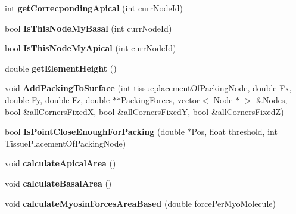 \begin{DoxyCompactItemize}
\item 
\hypertarget{classPrism_a10377e0ad0ae454a3cd25b82709119ac}{}int {\bfseries get\+Correcponding\+Apical} (int curr\+Node\+Id)\label{classPrism_a10377e0ad0ae454a3cd25b82709119ac}

\item 
\hypertarget{classPrism_abe648c5fa60635a50c14186135bed332}{}bool {\bfseries Is\+This\+Node\+My\+Basal} (int curr\+Node\+Id)\label{classPrism_abe648c5fa60635a50c14186135bed332}

\item 
\hypertarget{classPrism_ab9f3b638a4068180a11add5921870230}{}bool {\bfseries Is\+This\+Node\+My\+Apical} (int curr\+Node\+Id)\label{classPrism_ab9f3b638a4068180a11add5921870230}

\item 
\hypertarget{classPrism_a91d08cfcf6bf111f5d9e314499bafd11}{}double {\bfseries get\+Element\+Height} ()\label{classPrism_a91d08cfcf6bf111f5d9e314499bafd11}

\item 
\hypertarget{classPrism_aea2d84b05534bb2aedcdb49a53eab1ae}{}void {\bfseries Add\+Packing\+To\+Surface} (int tissueplacement\+Of\+Packing\+Node, double Fx, double Fy, double Fz, double $\ast$$\ast$Packing\+Forces, vector$<$ \hyperlink{classNode}{Node} $\ast$ $>$ \&Nodes, bool \&all\+Corners\+Fixed\+X, bool \&all\+Corners\+Fixed\+Y, bool \&all\+Corners\+Fixed\+Z)\label{classPrism_aea2d84b05534bb2aedcdb49a53eab1ae}

\item 
\hypertarget{classPrism_aec7672c8cf13ce1277e8004ddf0aa151}{}bool {\bfseries Is\+Point\+Close\+Enough\+For\+Packing} (double $\ast$Pos, float threshold, int Tissue\+Placement\+Of\+Packing\+Node)\label{classPrism_aec7672c8cf13ce1277e8004ddf0aa151}

\item 
\hypertarget{classPrism_a67e80515fb1cdf4438b4b7d47334bd2e}{}void {\bfseries calculate\+Apical\+Area} ()\label{classPrism_a67e80515fb1cdf4438b4b7d47334bd2e}

\item 
\hypertarget{classPrism_aa8dd4b90cdaecdbabfb48f45a9bcdc95}{}void {\bfseries calculate\+Basal\+Area} ()\label{classPrism_aa8dd4b90cdaecdbabfb48f45a9bcdc95}

\item 
\hypertarget{classPrism_a299e77942291fa9c801a05507c0c42c1}{}void {\bfseries calculate\+Myosin\+Forces\+Area\+Based} (double force\+Per\+Myo\+Molecule)\label{classPrism_a299e77942291fa9c801a05507c0c42c1}


\end{DoxyCompactItemize}
